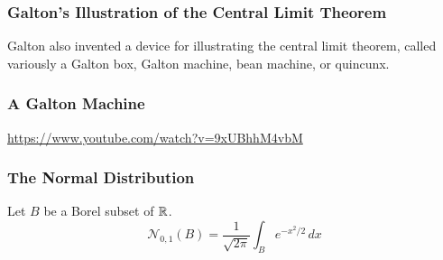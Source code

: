\documentclass{beamer}
\begin{document}
\begin{frame}
\frametitle{Galton's Illustration of the Central Limit Theorem}
Galton also invented a device for illustrating the central limit theorem, called variously a Galton box, Galton machine, bean machine, or quincunx. \pause

\end{frame}

\begin{frame}
\frametitle{A Galton Machine}
\url{https://www.youtube.com/watch?v=9xUBhhM4vbM}
\end{frame}

\begin{frame}
\frametitle{The Normal Distribution}
Let $B$ be a Borel subset of $\mathbb{R}$.
\[ \mathcal N_{0,1}(B) = \frac{1}{\sqrt {2\pi}} \int_B e^{-x^2/2} \, dx \] \pause
{}
\end{frame}
\end{document}

